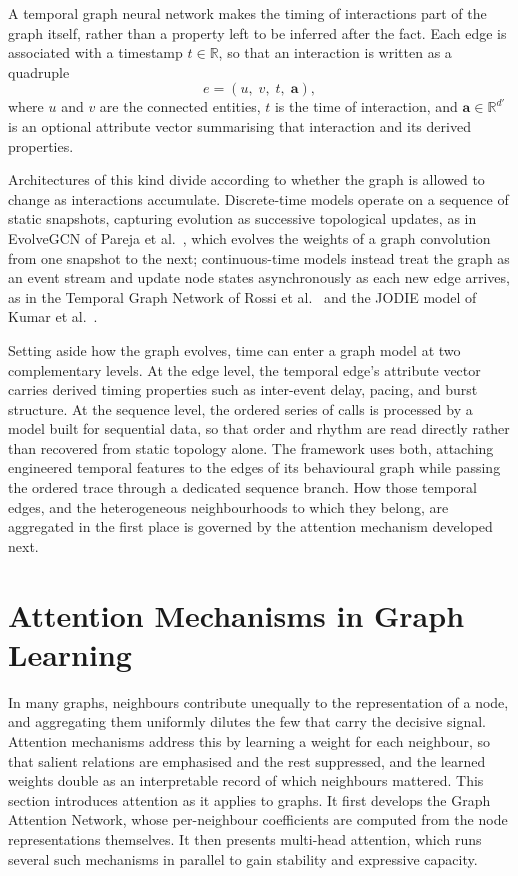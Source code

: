 \documentclass[%
    BCOR=10mm,
    DIV=13,
    toc=bibliography,
    toc=listof,
    oneside,
    12pt,
]{scrbook}
\begin{document}
A temporal graph neural network makes the timing of interactions part of the
graph itself, rather than a property left to be inferred after the fact. Each
edge is associated with a timestamp $t \in \mathbb{R}$, so that an interaction is
written as a quadruple
\begin{equation}
  e = (u,\; v,\; t,\; \mathbf{a}),
  \label{eq:temporal_edge}
\end{equation}
where $u$ and $v$ are the connected entities, $t$ is the time of interaction, and
$\mathbf{a} \in \mathbb{R}^{d'}$ is an optional attribute vector summarising that
interaction and its derived properties.

Architectures of this kind divide according to whether the graph is allowed to
change as interactions accumulate. Discrete-time models operate on a sequence
of static snapshots, capturing evolution as successive topological updates, as
in EvolveGCN of Pareja et al.~\cite{pareja2020evolvegcn}, which evolves the
weights of a graph convolution from one snapshot to the next; continuous-time
models instead treat the graph as an event stream and update node states
asynchronously as each new edge arrives, as in the Temporal Graph Network of
Rossi et al.~\cite{tgn2020} and the JODIE model of Kumar
et al.~\cite{kumar2019jodie}.

Setting aside how the graph evolves, time can enter a graph model at two
complementary levels. At the edge level, the temporal edge's attribute vector
carries derived timing properties such as inter-event delay, pacing, and burst
structure. At the sequence level, the ordered series of calls is processed by a
model built for sequential data, so that order and rhythm are read directly
rather than recovered from static topology alone. The framework uses both,
attaching engineered temporal features to the edges of its behavioural graph
while passing the ordered trace through a dedicated sequence branch. How those
temporal edges, and the heterogeneous neighbourhoods to which they belong, are
aggregated in the first place is governed by the attention mechanism developed
next.

\section{Attention Mechanisms in Graph Learning}
\label{sec:attention}

In many graphs, neighbours contribute unequally to the representation of a node,
and aggregating them uniformly dilutes the few that carry the decisive signal.
Attention mechanisms address this by learning a weight for each neighbour, so
that salient relations are emphasised and the rest suppressed, and the learned
weights double as an interpretable record of which neighbours mattered. This
section introduces attention as it applies to graphs. It first develops the
Graph Attention Network, whose per-neighbour coefficients are computed from the
node representations themselves. It then presents multi-head attention, which
runs several such mechanisms in parallel to gain stability and expressive
capacity.
\end{document}
